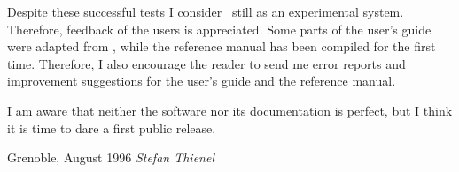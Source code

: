 Despite these successful tests I consider \ABACUS\ still as an experimental
system. 
Therefore, feedback of the users is appreciated.
Some parts of the user's guide were adapted from \cite{Thi95}, while
the reference manual has been compiled for the first time. Therefore,
I also encourage the reader to send me error reports and improvement
suggestions for the user's guide and the reference manual.

I am aware that neither the software nor its documentation is perfect,
but I think it is time to dare a first public release.

\bigskip
\bigskip\noindent
{Grenoble, August 1996 \hfill {\it Stefan Thienel}}


